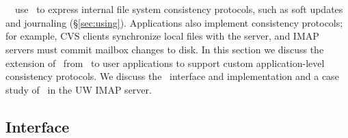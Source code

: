 \section{\Opgroups}
\label{sec:opgroup}

\newcommand{\opgroupCreate}{\texttt{patch\-group\_create()}}
\newcommand{\opgroupSync}{\texttt{patch\-group\_sync()}}
\newcommand{\opgroupAddDepend}{\texttt{patch\-group\_add\_depend()}}
\newcommand{\opgroupEngage}{\texttt{patch\-group\_engage()}}
\newcommand{\opgroupDisengage}{\texttt{patch\-group\_disengage()}}
\newcommand{\opgroupRelease}{\texttt{patch\-group\_release()}}
\newcommand{\opgroupAbandon}{\texttt{patch\-group\_abandon()}}

\Kudos\ \modules\ use \chdescs\ to express internal file system
consistency protocols, such as soft updates and journaling
(\S\ref{sec:using}).
%
Applications also implement consistency protocols; for example, CVS
clients synchronize local files with the server, and IMAP servers
must commit mailbox changes to disk. In this section we discuss the
extension of \chdescs\ from \Kudos\ to user applications to support
custom application-level consistency protocols. We discuss the
\opgroup\ interface and implementation and a case study of \opgroups\
in the UW IMAP server.

\begin{comment}
Old:
Many file systems strive to maintain internal file system consistency
across system and hardware failures; \chdescs\ can express such write
ordering requirements. But file systems are by no means the sole
players to benefit from robustness to system and hardware failures.
User applications often manipulate persistent data in manners subject
to data corruption or loss. Applications often protect user data using
interfaces like Unix's \texttt{sync()} and \texttt{fsync()} system
calls in combination with write ordering. \Opgroups\ provide finer
grained and less restrictive write ordering control so that
applications can express \textit{minimal} ordering requirements to
implement custom consistency semantics and make custom performance
requirement tradeoffs. In this section we present the \opgroup\
interface and implementation and a case study of \opgroups\ in the
UW IMAP server.
\end{comment}

\subsection{Interface}
\label{sec:opgroup:interface}

